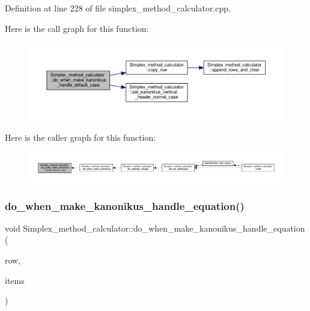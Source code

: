 Definition at line 228 of file simplex\+\_\+method\+\_\+calculator.\+cpp.

Here is the call graph for this function\+:\nopagebreak
\begin{figure}[H]
\begin{center}
\leavevmode
\includegraphics[width=350pt]{classSimplex__method__calculator_a8bd16d16283497488f78652ac559802d_cgraph}
\end{center}
\end{figure}
Here is the caller graph for this function\+:\nopagebreak
\begin{figure}[H]
\begin{center}
\leavevmode
\includegraphics[width=350pt]{classSimplex__method__calculator_a8bd16d16283497488f78652ac559802d_icgraph}
\end{center}
\end{figure}
\mbox{\label{classSimplex__method__calculator_a6a697c5e4aff9902f3aea4cf773a7bca}} 
\subsubsection{\texorpdfstring{do\+\_\+when\+\_\+make\+\_\+kanonikus\+\_\+handle\+\_\+equation()}{do\_when\_make\_kanonikus\_handle\_equation()}}
{\footnotesize\ttfamily void Simplex\+\_\+method\+\_\+calculator\+::do\+\_\+when\+\_\+make\+\_\+kanonikus\+\_\+handle\+\_\+equation (\begin{DoxyParamCaption}\item[{int}]{row,  }\item[{Q\+List$<$ Q\+Standard\+Item $\ast$$>$}]{items }\end{DoxyParamCaption})\hspace{0.3cm}{\ttfamily [private]}}



